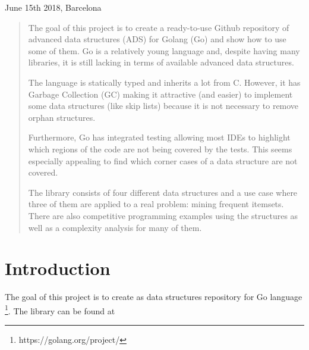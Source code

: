 \documentclass[a4paper,10pt,table,xcdraw]{article}
\begin{document}
\begin{titlepage}
         {June 15th 2018, Barcelona}\\[3cm] %
         \vfill %

\end{titlepage}

\newpage



\begin{abstract}
The goal of this project is to create a ready-to-use Github repository of advanced data structures (ADS) for Golang (Go) and show how to use some of them. Go is a relatively young language and, despite having many libraries, it is still lacking in terms of available advanced data structures. 

The language is statically typed and inherits a lot from C. However, it has Garbage Collection (GC) making it attractive (and easier) to implement some data structures (like skip lists) because it is not necessary to remove orphan structures.

Furthermore, Go has integrated testing allowing most IDEs to highlight which regions of the code are not being covered by the tests. This seems especially appealing to find which corner cases of a data structure are not covered.

The library consists of four different data structures and a use case where three of them are applied to a real problem: mining frequent itemsets. There are also competitive programming examples using the structures as well as a complexity analysis for many of them.

\end{abstract}


\newpage

\setcounter{tocdepth}{3}
\tableofcontents

\newpage

\section{Introduction}

The goal of this project is to create as data structures repository for Go language \footnote{ https://golang.org/project/}. The library can be found at
\end{document}
